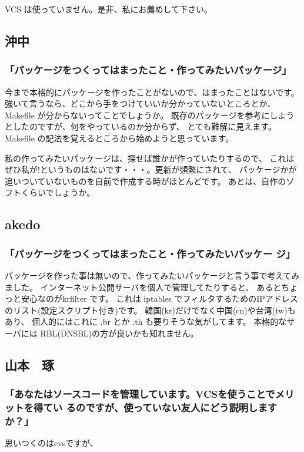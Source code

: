 \documentclass[mingoth,a4paper]{jsarticle}
\begin{document}
VCS は使っていません。是非、私にお薦めして下さい。

\subsection{沖中}


\subsubsection{「パッケージをつくってはまったこと・作ってみたいパッケージ」}

今まで本格的にパッケージを作ったことがないので、はまったことはないです。
強いて言うなら、どこから手をつけていいか分かっていないところとか、
Makefile が分からないってことでしょうか。
既存のパッケージを参考にしようとしたのですが、何をやっているのか分からず、
とても難解に見えます。Makefile の記法を覚えるところから始めようと思っています。

私の作ってみたいパッケージは、探せば誰かが作っていたりするので、
これはぜひ私が!というものはないです・・・。更新が頻繁にされて、
パッケージかが追いついていないものを自前で作成する時がほとんどです。
あとは、自作のソフトくらいでしょうか。

\subsection{akedo}

\subsubsection{「パッケージをつくってはまったこと・作ってみたいパッケー
   ジ」}

パッケージを作った事は無いので、作ってみたいパッケージと言う事で考えてみました。
インターネット公開サーバを個人で管理してたりすると、
あるとちょっと安心なのがkrfilter です。
これは iptables でフィルタするためのIPアドレスのリスト(設定スクリプト付き)です。
韓国(kr)だけでなく中国(cn)や台湾(tw)もあり、
個人的にはこれに .br とか .th も要りそうな気がしてます。
本格的なサーバには RBL(DNSBL)の方が良いかも知れません。

\subsection{山本　琢}

\subsubsection{「あなたはソースコードを管理しています。VCSを使うことでメリットを得てい
るのですが、使っていない友人にどう説明しますか？」}
思いつくのはcvsですが、
\end{document}
